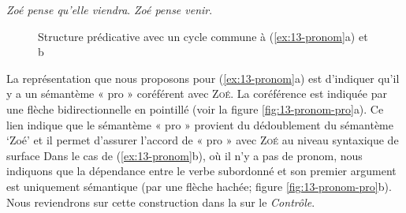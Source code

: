 \ea\label{ex:13-pronom}
\ea \textit{Zoé pense qu’elle viendra}.
\ex \textit{Zoé pense venir}.\z\z

\begin{figure}
\caption{Structure prédicative avec un cycle commune à (\ref{ex:13-pronom}a) et b\label{fig:13-pronom-sem}}
\end{figure}

La représentation que nous proposons pour (\ref{ex:13-pronom}a) est d’indiquer qu’il y a un sémantème « pro » coréférent avec \textsc{Zoé}. La coréférence est indiquée par une flèche bidirectionnelle en pointillé (voir la figure \ref{fig:13-pronom-pro}a). Ce lien indique que le sémantème « pro » provient du dédoublement du sémantème ‘Zoé’ et il permet d’assurer l’accord de « pro » avec \textsc{Zoé} au niveau syntaxique de surface Dans le cas de (\ref{ex:13-pronom}b), où il n’y a pas de pronom, nous indiquons que la dépendance entre le verbe subordonné et son premier argument est uniquement sémantique (par une flèche hachée; figure \ref{fig:13-pronom-pro}b). Nous reviendrons sur cette construction dans la  sur le \textit{Contrôle}.

